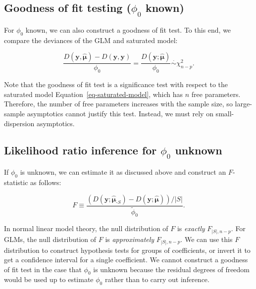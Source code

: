 \documentclass[
  11pt,
  letterpaper,
  oneside]{book}
\theoremstyle{definition}
\theoremstyle{plain}
\theoremstyle{plain}
\theoremstyle{plain}
\theoremstyle{remark}
\begin{document}
\hypertarget{sec-likelihood-ratio-goodness-of-fit}{%
\subsection{\texorpdfstring{Goodness of fit testing (\(\phi_0\)
known)}{Goodness of fit testing (\textbackslash phi\_0 known)}}\label{sec-likelihood-ratio-goodness-of-fit}}

For \(\phi_0\) known, we can also construct a goodness of fit test. To
this end, we compare the deviances of the GLM and saturated model:

\[
\frac{D(\boldsymbol{y}, \boldsymbol{\widehat{\mu}}) - D(\boldsymbol{y}, \boldsymbol{y})}{\phi_0} = \frac{D(\boldsymbol{y}; \boldsymbol{\widehat{\mu}})}{\phi_0} \overset{\cdot}{\sim} \chi^2_{n-p}.
\]

Note that the goodness of fit test is a significance test with respect
to the saturated model Equation~\ref{eq-saturated-model}, which has
\(n\) free parameters. Therefore, the number of free parameters
increases with the sample size, so large-sample asymptotics cannot
justify this test. Instead, we must rely on small-dispersion
asymptotics.

\hypertarget{sec-likelihood-ratio-unknown-dispersion}{%
\subsection{\texorpdfstring{Likelihood ratio inference for \(\phi_0\)
unknown}{Likelihood ratio inference for \textbackslash phi\_0 unknown}}\label{sec-likelihood-ratio-unknown-dispersion}}

If \(\phi_0\) is unknown, we can estimate it as discussed above and
construct an \(F\)-statistic as follows:

\[
F \equiv \frac{(D(\boldsymbol{y}; \boldsymbol{\widehat{\mu}}_{\text{-}S}) - D(\boldsymbol{y}; \boldsymbol{\widehat{\mu}}))/|S|}{\widetilde{\phi}_0}.
\]

In normal linear model theory, the null distribution of \(F\) is
\emph{exactly} \(F_{|S|, n-p}\). For GLMs, the null distribution of
\(F\) is \emph{approximately} \(F_{|S|, n-p}\). We can use this \(F\)
distribution to construct hypothesis tests for groups of coefficients,
or invert it to get a confidence interval for a single coefficient. We
cannot construct a goodness of fit test in the case that \(\phi_0\) is
unknown because the residual degrees of freedom would be used up to
estimate \(\phi_0\) rather than to carry out inference.
\end{document}

